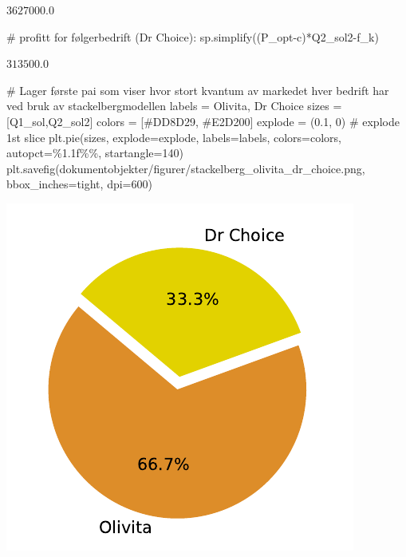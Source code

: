 \documentclass[
  12pt,
  a4paper,
  DIV=11,
  numbers=noendperiod]{scrartcl}
\newenvironment{Shaded}{\begin{snugshade}}{\end{snugshade}}
\newcommand{\CommentTok}[1]{\textcolor[rgb]{0.37,0.37,0.37}{#1}}
\newcommand{\DecValTok}[1]{\textcolor[rgb]{0.68,0.00,0.00}{#1}}
\newcommand{\FloatTok}[1]{\textcolor[rgb]{0.68,0.00,0.00}{#1}}
\newcommand{\NormalTok}[1]{\textcolor[rgb]{0.00,0.23,0.31}{#1}}
\newcommand{\OperatorTok}[1]{\textcolor[rgb]{0.37,0.37,0.37}{#1}}
\newcommand{\SpecialCharTok}[1]{\textcolor[rgb]{0.37,0.37,0.37}{#1}}
\newcommand{\StringTok}[1]{\textcolor[rgb]{0.13,0.47,0.30}{#1}}
\begin{document}
$\displaystyle 3627000.0$

\begin{Shaded}
\begin{Highlighting}[]
\CommentTok{\# profitt for følgerbedrift (Dr Choice):}
\NormalTok{sp.simplify((P\_opt}\OperatorTok{{-}}\NormalTok{c)}\OperatorTok{*}\NormalTok{Q2\_sol2}\OperatorTok{{-}}\NormalTok{f\_k)}
\end{Highlighting}
\end{Shaded}

$\displaystyle 313500.0$

\begin{Shaded}
\begin{Highlighting}[]
\CommentTok{\# Lager første pai som viser hvor stort kvantum av markedet hver bedrift har ved bruk av stackelbergmodellen}
\NormalTok{labels }\OperatorTok{=} \StringTok{\textquotesingle{}Olivita\textquotesingle{}}\NormalTok{, }\StringTok{\textquotesingle{}Dr Choice\textquotesingle{}}
\NormalTok{sizes }\OperatorTok{=}\NormalTok{ [Q1\_sol,Q2\_sol2]}
\NormalTok{colors }\OperatorTok{=}\NormalTok{ [}\StringTok{\textquotesingle{}\#DD8D29\textquotesingle{}}\NormalTok{, }\StringTok{\textquotesingle{}\#E2D200\textquotesingle{}}\NormalTok{]}
\NormalTok{explode }\OperatorTok{=}\NormalTok{ (}\FloatTok{0.1}\NormalTok{, }\DecValTok{0}\NormalTok{)  }\CommentTok{\# explode 1st slice}
\NormalTok{plt.pie(sizes, explode}\OperatorTok{=}\NormalTok{explode, labels}\OperatorTok{=}\NormalTok{labels, colors}\OperatorTok{=}\NormalTok{colors, autopct}\OperatorTok{=}\StringTok{\textquotesingle{}}\SpecialCharTok{\%1.1f\%\%}\StringTok{\textquotesingle{}}\NormalTok{, startangle}\OperatorTok{=}\DecValTok{140}\NormalTok{)}
\NormalTok{plt.savefig(}\StringTok{\textquotesingle{}dokumentobjekter/figurer/stackelberg\_olivita\_dr\_choice.png\textquotesingle{}}\NormalTok{, bbox\_inches}\OperatorTok{=}\StringTok{\textquotesingle{}tight\textquotesingle{}}\NormalTok{, dpi}\OperatorTok{=}\DecValTok{600}\NormalTok{)}
\end{Highlighting}
\end{Shaded}

\includegraphics{Kandidatnummer_30_mappeoppgave_2_SOK_2030_files/figure-pdf/cell-11-output-1.pdf}
\end{document}
